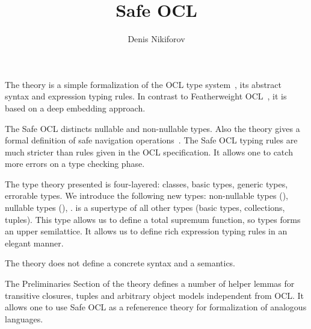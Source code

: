 \documentclass[11pt,a4paper]{book}
\makeatletter
\newenvironment{abstract}{%
  \small
  \begin{center}%
    {\bfseries \abstractname\vspace{-.5em}\vspace{\z@}}%
  \end{center}%
  \quotation}{\endquotation}
\makeatother
\begin{document}
\title{Safe OCL}
\author{Denis Nikiforov}
\maketitle

\begin{abstract}
  The theory is a simple formalization of the OCL type system~\cite{OCL24},
  its abstract syntax and expression typing rules.
  In contrast to Featherweight OCL~\cite{Featherweight_OCL-AFP},
  it is based on a deep embedding approach.

  The Safe OCL distincts nullable and non-nullable types. Also
  the theory gives a formal definition of safe navigation
  operations~\cite{DBLP:conf/models/Willink15}. The Safe OCL typing rules
  are much stricter than rules given in the OCL specification.
  It allows one to catch more errors on a type checking phase.

  The type theory presented is four-layered: classes, basic types,
  generic types, errorable types. We introduce the following new types:
  non-nullable types (),
  nullable types (\isa{{\isasymtau}{\isacharbrackleft}{\isacharquery}{\isacharbrackright}}),
  .  is a supertype of all other types
  (basic types, collections, tuples). This type allows us to define
  a total supremum function, so types forms an upper semilattice.
  It allows us to define rich expression typing rules in an elegant manner.

  The theory does not define a concrete syntax and a semantics.

  The Preliminaries Section of the theory defines a number of
  helper lemmas for transitive closures, tuples and arbitrary
  object models independent from OCL. It allows one to use
  Safe OCL as a refenerence theory for formalization of
  analogous languages.
\end{abstract}

\tableofcontents





\end{document}
